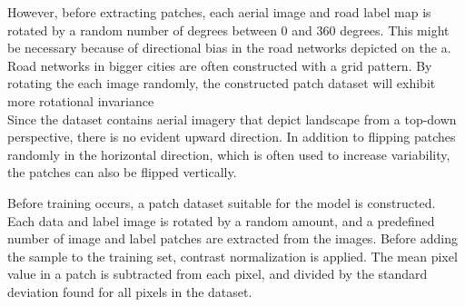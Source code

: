 However, before extracting patches, each aerial image and road label map is rotated by a random number of degrees between 0 and 360 degrees. This might be necessary because of directional bias in the road networks depicted on the a. Road networks in bigger cities are often constructed with a grid pattern. By rotating the each image randomly, the constructed patch dataset will exhibit more rotational invariance \\

Since the dataset contains aerial imagery that depict landscape from a top-down perspective, there is no evident upward direction. In addition to flipping patches randomly in the horizontal direction, which is often used to increase variability, the patches can also be flipped vertically.\cite{Vertical, and horizontal flipping. And a well formulated sentence about why this is a great idea.}


Before training occurs, a patch dataset suitable for the model is constructed. Each data and label image is rotated by a random amount, and a predefined number of image and label patches are extracted from the images. Before adding the sample to the training set, contrast normalization is applied. The mean pixel value in a patch is subtracted from each pixel, and divided by the standard deviation found for all pixels in the dataset.\\

